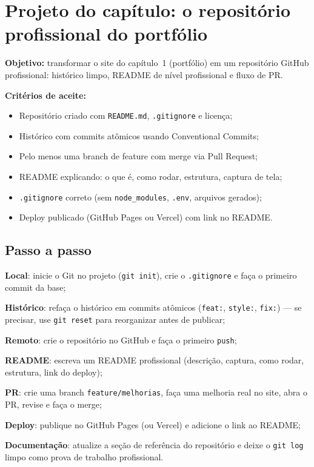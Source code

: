 \section{Projeto do capítulo: o repositório profissional do portfólio}
\label{sec:projeto5}

\begin{caixaprojeto}
\textbf{Objetivo:} transformar o site do capítulo~1 (portfólio) em um
repositório GitHub profissional: histórico limpo, README de nível
profissional e fluxo de PR.

\textbf{Critérios de aceite:}
\begin{itemize}[leftmargin=*, itemsep=0.2em]
  \item Repositório criado com \texttt{README.md}, \texttt{.gitignore} e licença;
  \item Histórico com commits atômicos usando Conventional Commits;
  \item Pelo menos uma branch de feature com merge via Pull Request;
  \item README explicando: o que é, como rodar, estrutura, captura de tela;
  \item \texttt{.gitignore} correto (sem \texttt{node\_modules}, \texttt{.env}, arquivos gerados);
  \item Deploy publicado (GitHub Pages ou Vercel) com link no README.
\end{itemize}
\end{caixaprojeto}

\subsection{Passo a passo}

\begin{passos}
  \item \textbf{Local}: inicie o Git no projeto (\texttt{git init}), crie o
  \texttt{.gitignore} e faça o primeiro commit da base;
  \item \textbf{Histórico}: refaça o histórico em commits atômicos
  (\texttt{feat:}, \texttt{style:}, \texttt{fix:}) — se precisar, use
  \texttt{git reset} para reorganizar antes de publicar;
  \item \textbf{Remoto}: crie o repositório no GitHub e faça o primeiro
  \texttt{push};
  \item \textbf{README}: escreva um README profissional (descrição, captura,
  como rodar, estrutura, link do deploy);
  \item \textbf{PR}: crie uma branch \texttt{feature/melhorias}, faça uma
  melhoria real no site, abra o PR, revise e faça o merge;
  \item \textbf{Deploy}: publique no GitHub Pages (ou Vercel) e adicione o
  link ao README;
  \item \textbf{Documentação}: atualize a seção de referência do repositório
  e deixe o \texttt{git log} limpo como prova de trabalho profissional.
\end{passos}

